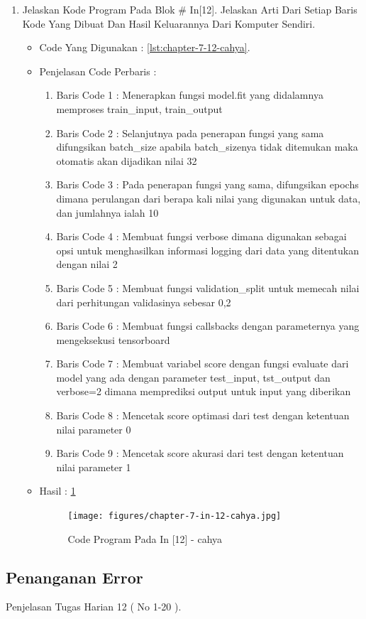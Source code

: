 \begin{enumerate}
\par
\par
\item Jelaskan Kode Program Pada Blok \# In[12]. Jelaskan Arti Dari Setiap Baris Kode Yang Dibuat Dan Hasil Keluarannya Dari Komputer Sendiri.
\begin{itemize}
\item Code Yang Digunakan : \ref{lst:chapter-7-12-cahya}.

\par
\par
\item Penjelasan Code Perbaris	: 
\begin{enumerate}
\item Baris Code 1	: Menerapkan fungsi model.fit yang didalamnya memproses train\_input, train\_output
\item Baris Code 2	: Selanjutnya pada penerapan fungsi yang sama difungsikan batch\_size apabila batch\_sizenya tidak ditemukan maka otomatis akan dijadikan nilai 32
\item Baris Code 3	: Pada penerapan fungsi yang sama, difungsikan epochs dimana perulangan dari berapa kali nilai yang digunakan untuk data, dan jumlahnya ialah 10
\item Baris Code 4	: Membuat fungsi verbose dimana digunakan sebagai opsi untuk menghasilkan informasi logging dari data yang ditentukan dengan nilai 2
\item Baris Code 5	: Membuat fungsi validation\_split untuk memecah nilai dari perhitungan validasinya sebesar 0,2
\item Baris Code 6	: Membuat fungsi callsbacks dengan parameternya yang mengeksekusi tensorboard 
\item Baris Code 7	: Membuat variabel score dengan fungsi evaluate dari model yang ada dengan parameter test\_input, tst\_output dan verbose=2 dimana memprediksi output untuk input yang diberikan
\item Baris Code 8	: Mencetak score optimasi dari test dengan ketentuan nilai parameter 0
\item Baris Code 9	: Mencetak score akurasi dari test dengan ketentuan nilai parameter 1
\end{enumerate}
\par
\item Hasil : \ref{chapter-7-in-12-cahya}
\par
\par
\begin{figure}[!hbtp]
\centering
\texttt{[image: figures/chapter-7-in-12-cahya.jpg]}
\caption{Code Program Pada In [12] - cahya}
\label{chapter-7-in-12-cahya}
\end{figure}
\end{itemize}

\end{enumerate}



\subsection{Penanganan Error}
Penjelasan Tugas Harian 12 ( No 1-20 ).
\par
\par
